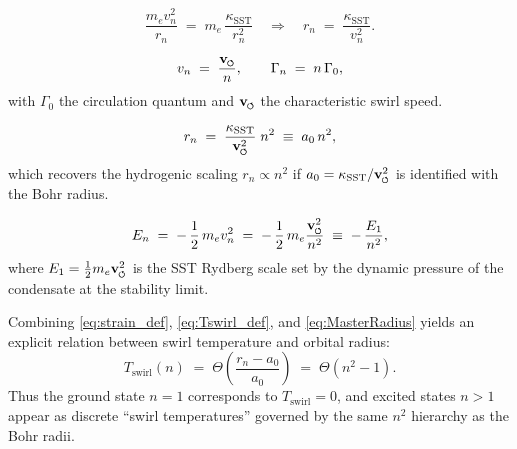 \documentclass[11pt]{article}
\newcommand{\vswirl}{\mathbf{v}_{\mkern-2mu\scriptscriptstyle\boldsymbol{\circlearrowleft}}}
\begin{document}
            \begin{equation}
                \frac{m_e v_n^2}{r_n}
                \;=\;
                m_e \,\frac{\kappa_{\mathrm{SST}}}{r_n^2}
                \quad\Rightarrow\quad
                r_n
                \;=\;
                \frac{\kappa_{\mathrm{SST}}}{v_n^{2}}.
                \label{eq:ForceBalance}
            \end{equation}

            \begin{equation}
                v_n
                \;=\;
                \frac{\vswirl}{n},
                \qquad
                \Gamma_n
                \;=\;
                n\,\Gamma_0,
                \label{eq:VelocityQuantization}
            \end{equation}
            with \(\Gamma_0\) the circulation quantum and \(\vswirl\) the characteristic swirl speed.

            \begin{equation}
                r_n
                \;=\;
                \frac{\kappa_{\mathrm{SST}}}{\vswirl^2}\;n^2
                \;\equiv\;
                a_0\,n^2,
                \label{eq:MasterRadius}
            \end{equation}
            which recovers the hydrogenic scaling \(r_n \propto n^2\) if
            \(a_0 = \kappa_{\mathrm{SST}}/\vswirl^2\) is identified with the Bohr radius.

            \begin{equation}
                E_n
                \;=\;
                -\,\frac{1}{2}\,m_e v_n^2
                \;=\;
                -\,\frac{1}{2}\,m_e \frac{\vswirl^2}{n^2}
                \;\equiv\;
                -\,\frac{E_1}{n^2},
                \label{eq:MasterEnergy}
            \end{equation}
            where \(E_1 = \tfrac{1}{2}m_e \vswirl^2\) is the SST Rydberg scale set by the
            dynamic pressure of the condensate at the stability limit.

            Combining \eqref{eq:strain_def}, \eqref{eq:Tswirl_def}, and \eqref{eq:MasterRadius}
            yields an explicit relation between swirl temperature and orbital radius:
            \begin{equation}
                T_{\text{swirl}}(n)
                \;=\;
                \Theta \left( \frac{r_n - a_0}{a_0} \right)
                \;=\;
                \Theta \left( n^2 - 1 \right).
                \label{eq:Tswirl_n}
            \end{equation}
            Thus the ground state \(n=1\) corresponds to \(T_{\text{swirl}}=0\), and excited
            states \(n>1\) appear as discrete “swirl temperatures” governed by the same
            \(n^2\) hierarchy as the Bohr radii.
\end{document}
